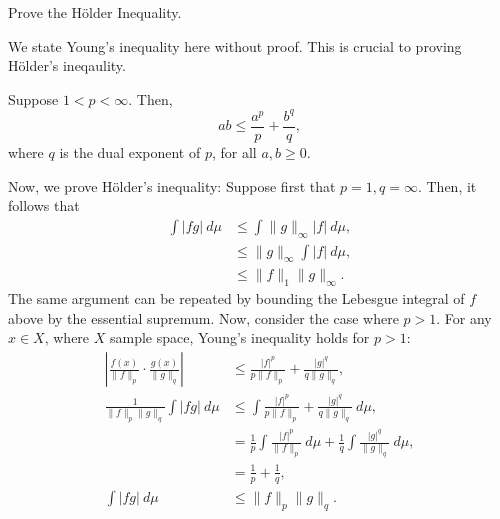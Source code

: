 \begin{problem}{10}
\end{problem}
\begin{solution}
\end{solution}

\begin{problem}{11}
\end{problem}
\begin{solution}
\end{solution}

\begin{problem}{12}
Prove the Hölder Inequality.
\end{problem}
\begin{solution}
    We state Young's inequality here without proof. This is crucial to proving Hölder's ineqaulity.
    \begin{theorem}
        Suppose $1 < p < \infty$. Then, 
        \[
            ab \leq \frac{a^p}{p} + \frac{b^{q}}{q},  
        \]
        where $q$ is the dual exponent of $p$, for all $a, b \geq 0$.
    \end{theorem}
    Now, we prove Hölder's inequality:
    Suppose first that $p=1,q=\infty$. Then, it follows that 
    \begin{align*}
        \int |fg|~d\mu &\leq \int \lVert g \rVert_\infty |f|~d\mu, \\
        &\leq \lVert g \rVert_\infty  \int |f|~d\mu, \\
        &\leq \lVert f \rVert_1 \lVert g \rVert_\infty.
    \end{align*}
    The same argument can be repeated by bounding the Lebesgue integral of $f$ above by the essential supremum. Now, consider the case where $p > 1$. For any $x\in X$, where $X$ sample space, Young's inequality holds for $p > 1$: 
    \begin{align*}
        \left| \frac{f(x)}{\lVert f \rVert_p} \cdot \frac{g(x)}{\lVert g \rVert_q} \right| &\leq \frac{|f|^p}{p\lVert f\rVert_p} + \frac{|g|^q}{q\lVert g\rVert_q}, \\
        \frac{1}{\lVert f\rVert_p \lVert g \rVert_q}\int |fg|~d\mu &\leq \int \frac{|f|^p}{p\lVert f\rVert_p} + \frac{|g|^q}{q\lVert g\rVert_q}~d\mu, \\
        &= \frac{1}{p} \int \frac{|f|^p}{\lVert f\rVert_p}~d\mu + \frac{1}{q} \int \frac{|g|^q}{\lVert g\rVert_q}~d\mu, \\
        &= \frac{1}{p} + \frac{1}{q}, \\
        \int |fg|~d\mu &\leq \lVert f \rVert_p \lVert g \rVert_q.
    \end{align*}
\end{solution}

\begin{problem}{13}
\end{problem}
\begin{solution}
\end{solution}